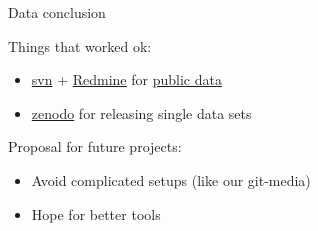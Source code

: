 \documentclass{beamer}
\begin{document}
\begin{frame}{Data conclusion}

    Things that worked ok:
    \begin{itemize}
        \item \href{https://subversion.apache.org}{svn} +
            \href{http://www.redmine.org}{Redmine} for
            \href{https://dev.qu.tu-berlin.de/projects/twoears-getdata/repository}{public
            data}
        \item \href{https://zenodo.org}{zenodo} for releasing single data sets
    \end{itemize}

    \vspace{0.6cm}

    Proposal for future projects:
    \begin{itemize}
        \item Avoid complicated setups (like our git-media)
        \item Hope for better tools
    \end{itemize}

\end{frame}
\end{document}
